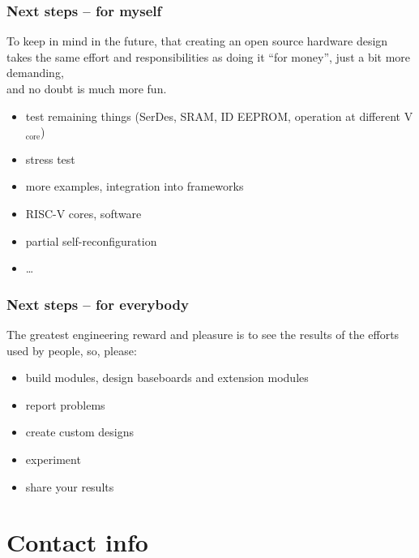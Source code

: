 \begin{frame}
  \frametitle{Next steps -- for myself}

  To keep in mind in the future, that creating an open source hardware
  design takes the same effort and responsibilities as doing it ``for
  money'', just a bit more demanding,\\and no doubt is much more fun.

  \vspace{.5cm}

  \begin{itemize}
  \item test remaining things (SerDes, SRAM, ID EEPROM,
  operation at different V$_{\text{core}}$)
  \item stress test
  \item more examples, integration into frameworks
  \item RISC-V cores, software
  \item partial self-reconfiguration
  \item \dots
  \end{itemize}
\end{frame}

\begin{frame}
  \frametitle{Next steps -- for everybody}

  The greatest engineering reward and pleasure is to see the results
  of the efforts used by people, so, please:

  \vspace{.5cm}

  \begin{itemize}
  \item build modules, design baseboards and extension modules
  \item report problems
  \item create custom designs
  \item experiment
  \item share your results
  \end{itemize}

  \vspace{-2cm}
  \begin{flushright}
    
  \end{flushright}

\end{frame}

\section{Contact info}




